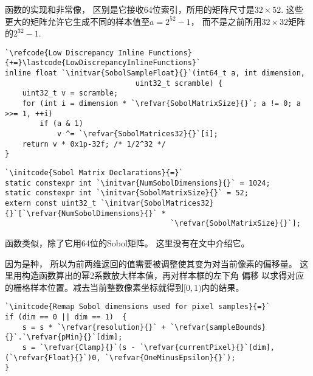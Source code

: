 函数的实现和非常像，
区别是它接收64位索引，所用的矩阵尺寸是$32\times52$.
这些更大的矩阵允许它生成不同的样本值至$a=2^{52}-1$，
而不是之前所用$32\times32$矩阵的$2^{32}-1$.
\begin{lstlisting}
`\refcode{Low Discrepancy Inline Functions}{+=}\lastcode{LowDiscrepancyInlineFunctions}`
inline float `\initvar{SobolSampleFloat}{}`(int64_t a, int dimension,
                              uint32_t scramble) {
    uint32_t v = scramble;
    for (int i = dimension * `\refvar{SobolMatrixSize}{}`; a != 0; a >>= 1, ++i)
        if (a & 1)
            v ^= `\refvar{SobolMatrices32}{}`[i];
    return v * 0x1p-32f; /* 1/2^32 */
}
\end{lstlisting}
\begin{lstlisting}
`\initcode{Sobol Matrix Declarations}{=}`
static constexpr int `\initvar{NumSobolDimensions}{}` = 1024;
static constexpr int `\initvar{SobolMatrixSize}{}` = 52;
extern const uint32_t `\initvar{SobolMatrices32}{}`[`\refvar{NumSobolDimensions}{}` *
                                      `\refvar{SobolMatrixSize}{}`];
\end{lstlisting}

函数{}类似，除了它用64位的Sobol矩阵。
这里没有在文中介绍它。

因为是种，
所以为前两维返回的值需要被调整使其变为对当前像素的偏移量。
这里用构造函数算出的幂2系数放大样本值，再对样本框的左下角
偏移
以求得对应的栅格样本位置。减去当前整数像素坐标就得到$[0,1)$内的结果。
\begin{lstlisting}
`\initcode{Remap Sobol dimensions used for pixel samples}{=}`
if (dim == 0 || dim == 1)  {
    s = s * `\refvar{resolution}{}` + `\refvar{sampleBounds}{}`.`\refvar{pMin}{}`[dim];
    s = `\refvar{Clamp}{}`(s - `\refvar{currentPixel}{}`[dim], (`\refvar{Float}{}`)0, `\refvar{OneMinusEpsilon}{}`);
}
\end{lstlisting}